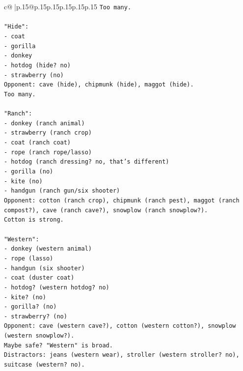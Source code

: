 \documentclass{article}
\begin{document}
{\begin{supertabular}{c@{$\;$}|p{.15\linewidth}@{}p{.15\linewidth}p{.15\linewidth}p{.15\linewidth}p{.15\linewidth}p{.15\linewidth}}
{{{\texttt{Too many.} \\
\\ 
\texttt{"Hide":} \\
\texttt{{-} coat} \\
\texttt{{-} gorilla} \\
\texttt{{-} donkey} \\
\texttt{{-} hotdog (hide? no)} \\
\texttt{{-} strawberry (no)} \\
\texttt{Opponent: cave (hide), chipmunk (hide), maggot (hide).} \\
\texttt{Too many.} \\
\\ 
\texttt{"Ranch":} \\
\texttt{{-} donkey (ranch animal)} \\
\texttt{{-} strawberry (ranch crop)} \\
\texttt{{-} coat (ranch coat)} \\
\texttt{{-} rope (ranch rope/lasso)} \\
\texttt{{-} hotdog (ranch dressing? no, that's different)} \\
\texttt{{-} gorilla (no)} \\
\texttt{{-} kite (no)} \\
\texttt{{-} handgun (ranch gun/six shooter)} \\
\texttt{Opponent: cotton (ranch crop), chipmunk (ranch pest), maggot (ranch compost?), cave (ranch cave?), snowplow (ranch snowplow?).} \\
\texttt{Cotton is strong.} \\
\\ 
\texttt{"Western":} \\
\texttt{{-} donkey (western animal)} \\
\texttt{{-} rope (lasso)} \\
\texttt{{-} handgun (six shooter)} \\
\texttt{{-} coat (duster coat)} \\
\texttt{{-} hotdog? (western hotdog? no)} \\
\texttt{{-} kite? (no)} \\
\texttt{{-} gorilla? (no)} \\
\texttt{{-} strawberry? (no)} \\
\texttt{Opponent: cave (western cave?), cotton (western cotton?), snowplow (western snowplow?).} \\
\texttt{Maybe safe? "Western" is broad.} \\
\texttt{Distractors: jeans (western wear), stroller (western stroller? no), suitcase (western? no).} \\
}}}
\end{supertabular}}
\end{document}
